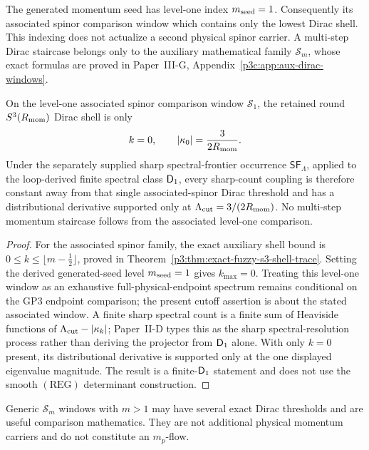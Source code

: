 \documentclass[12pt,a4paper]{article}
\begin{document}
The generated momentum seed has level-one index \(m_{\rm seed}=1\).
Consequently its associated spinor comparison window which contains only the lowest
Dirac shell.  This indexing does not actualize a second physical spinor carrier.  A
multi-step Dirac staircase belongs only to the auxiliary mathematical family
\(\mathcal S_m\), whose exact formulas are proved in
Paper~III-G, Appendix~\ref{p3c:app:aux-dirac-windows}.

\begin{theorem}
\label{p3:thm:exact-rg}
On the level-one associated spinor comparison window \(\mathcal S_1\), the retained round
\(S^3(R_{\mathrm{mom}})\) Dirac shell is only
\[
        k=0,
        \qquad
        |\kappa_0|=\frac{3}{2R_{\mathrm{mom}}}.
\]
Under the separately supplied sharp spectral-frontier occurrence
\(\mathsf{SF}_\Lambda\), applied to the loop-derived finite spectral class
\(\mathsf{D}_1\), every sharp-count coupling is therefore constant away from that
single associated-spinor Dirac threshold and has a distributional derivative supported only at
\(\Lambda_{\mathrm{cut}}=3/(2R_{\mathrm{mom}})\).  No multi-step momentum staircase follows from the associated level-one comparison.
\end{theorem}

\begin{proof}
For the associated spinor family, the exact auxiliary shell bound is
\(0\le k\le\lfloor m-\tfrac12\rfloor\), proved in
Theorem~\ref{p3:thm:exact-fuzzy-s3-shell-trace}.  Setting the derived generated-seed level \(m_{\rm seed}=1\)
gives \(k_{\max}=0\).  Treating this level-one window as an
exhaustive full-physical-endpoint spectrum remains conditional on the
GP3 endpoint comparison; the present cutoff assertion is about the
stated associated window.  A finite sharp spectral count
is a finite sum of Heaviside functions of \(\Lambda_{\mathrm{cut}}-|\kappa_k|\); Paper~II-D
types this as the sharp spectral-resolution process rather than deriving the
projector from \(\mathsf{D}_1\) alone.  With only
\(k=0\) present, its distributional derivative is supported only at the one
displayed eigenvalue magnitude.  The result is a finite-\(\mathsf{D}_1\) statement
and does not use the smooth \((\mathrm{REG})\) determinant construction.
\end{proof}

\begin{remark}
Generic \(\mathcal S_m\) windows with \(m>1\) may have several exact Dirac
thresholds and are useful comparison mathematics.  They are not additional
physical momentum carriers and do not constitute an \(m_p\)-flow.
\end{remark}
\end{document}
